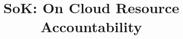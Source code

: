 \documentclass[10pt, conference]{IEEEtran}
\begin{document}
\title{SoK: On Cloud Resource Accountability}

\maketitle

       









%
%

%
\end{document}
